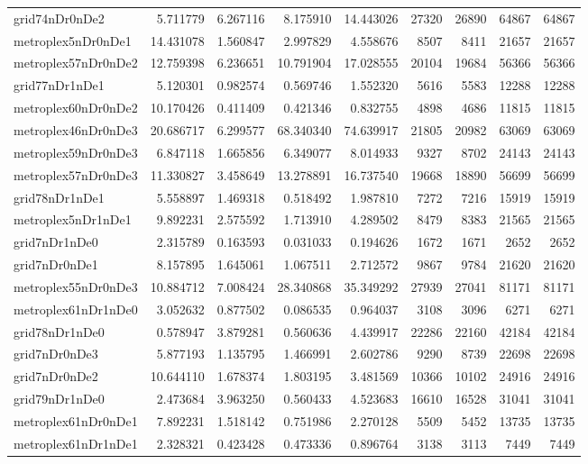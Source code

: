 \begin{longtable}{|l|r|r|r|r|r|r|r|r|}
grid74nDr0nDe2 & 5.711779 & 6.267116 & 8.175910 & 14.443026 & 27320 & 26890 & 64867 & 64867 \\
metroplex5nDr0nDe1 & 14.431078 & 1.560847 & 2.997829 & 4.558676 & 8507 & 8411 & 21657 & 21657 \\
metroplex57nDr0nDe2 & 12.759398 & 6.236651 & 10.791904 & 17.028555 & 20104 & 19684 & 56366 & 56366 \\
grid77nDr1nDe1 & 5.120301 & 0.982574 & 0.569746 & 1.552320 & 5616 & 5583 & 12288 & 12288 \\
metroplex60nDr0nDe2 & 10.170426 & 0.411409 & 0.421346 & 0.832755 & 4898 & 4686 & 11815 & 11815 \\
metroplex46nDr0nDe3 & 20.686717 & 6.299577 & 68.340340 & 74.639917 & 21805 & 20982 & 63069 & 63069 \\
metroplex59nDr0nDe3 & 6.847118 & 1.665856 & 6.349077 & 8.014933 & 9327 & 8702 & 24143 & 24143 \\
metroplex57nDr0nDe3 & 11.330827 & 3.458649 & 13.278891 & 16.737540 & 19668 & 18890 & 56699 & 56699 \\
grid78nDr1nDe1 & 5.558897 & 1.469318 & 0.518492 & 1.987810 & 7272 & 7216 & 15919 & 15919 \\
metroplex5nDr1nDe1 & 9.892231 & 2.575592 & 1.713910 & 4.289502 & 8479 & 8383 & 21565 & 21565 \\
grid7nDr1nDe0 & 2.315789 & 0.163593 & 0.031033 & 0.194626 & 1672 & 1671 & 2652 & 2652 \\
grid7nDr0nDe1 & 8.157895 & 1.645061 & 1.067511 & 2.712572 & 9867 & 9784 & 21620 & 21620 \\
metroplex55nDr0nDe3 & 10.884712 & 7.008424 & 28.340868 & 35.349292 & 27939 & 27041 & 81171 & 81171 \\
metroplex61nDr1nDe0 & 3.052632 & 0.877502 & 0.086535 & 0.964037 & 3108 & 3096 & 6271 & 6271 \\
grid78nDr1nDe0 & 0.578947 & 3.879281 & 0.560636 & 4.439917 & 22286 & 22160 & 42184 & 42184 \\
grid7nDr0nDe3 & 5.877193 & 1.135795 & 1.466991 & 2.602786 & 9290 & 8739 & 22698 & 22698 \\
grid7nDr0nDe2 & 10.644110 & 1.678374 & 1.803195 & 3.481569 & 10366 & 10102 & 24916 & 24916 \\
grid79nDr1nDe0 & 2.473684 & 3.963250 & 0.560433 & 4.523683 & 16610 & 16528 & 31041 & 31041 \\
metroplex61nDr0nDe1 & 7.892231 & 1.518142 & 0.751986 & 2.270128 & 5509 & 5452 & 13735 & 13735 \\
metroplex61nDr1nDe1 & 2.328321 & 0.423428 & 0.473336 & 0.896764 & 3138 & 3113 & 7449 & 7449 \\

\end{longtable}
